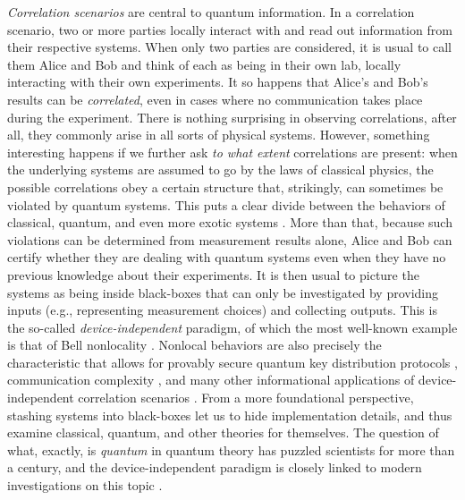 \emph{Correlation scenarios} are central to quantum information. In a correlation scenario, two or more parties locally interact with and read out information from their respective systems. When only two parties are considered, it is usual to call them Alice and Bob and think of each as being in their own lab, locally interacting with their own experiments. It so happens that Alice's and Bob's results can be \emph{correlated}, even in cases where no communication takes place during the experiment. There is nothing surprising in observing correlations, after all, they commonly arise in all sorts of physical systems. However, something interesting happens if we further ask \emph{to what extent} correlations are present: when the underlying systems are assumed to go by the laws of classical physics, the possible correlations obey a certain structure that, strikingly, can sometimes be violated by quantum systems. This puts a clear divide between the behaviors of classical, quantum, and even more exotic systems \cite{prbox}. More than that, because such violations can be determined from measurement results alone, Alice and Bob can certify whether they are dealing with quantum systems even when they have no previous knowledge about their experiments. It is then usual to picture the systems as being inside black-boxes that can only be investigated by providing inputs (e.g., representing measurement choices) and collecting outputs. This is the so-called \emph{device-independent} paradigm, of which the most well-known example is that of Bell nonlocality \cite{brunner_2014_nonlocality}. %
Nonlocal behaviors are also precisely the characteristic that allows for provably secure quantum key distribution protocols \cite{ekert91}, communication complexity \cite{buhrman_communicationreview_2010}, and many other informational applications of device-independent correlation scenarios \cite{brunner_2014_nonlocality}. From a more foundational perspective, stashing systems into black-boxes let us to hide implementation details, and thus examine classical, quantum, and other theories for themselves. The question of what, exactly, is \emph{quantum} in quantum theory has puzzled scientists for more than a century, and the device-independent paradigm is closely linked to modern investigations on this topic \cite{barrett_gpts_2007,plavala_gpts_2021,spekkens_2005_contextuality}.  

